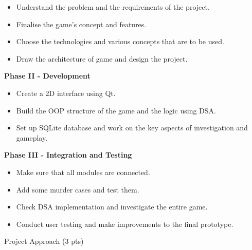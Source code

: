 \documentclass[11pt,a4paper]{article}
\newcommand{\blueheading}[1]{%
    {\sffamily\color{TitleBlue}\fontsize{15}{18}\selectfont #1}%
}
\begin{document}
{\begin{itemize}[leftmargin=1.5em, itemsep=4pt, topsep=0pt]
\item Understand the problem and the requirements of the project.
\item Finalise the game’s concept and features.
\item Choose the technologies and various concepts that are to be used.
\item Draw the architecture of game and design the project.
\end{itemize}
\vspace{2mm}
\textbf{Phase II - Development}
\begin{itemize}[leftmargin=1.5em, itemsep=4pt, topsep=0pt]
\item Create a 2D interface using Qt.
\item Build the OOP structure of the game and the logic using DSA.
\item Set up SQLite database and work on the key aspects of investigation and gameplay.
\end{itemize}
\vspace{2mm}
\textbf{Phase III - Integration and Testing}
\begin{itemize}[leftmargin=1.5em, itemsep=4pt, topsep=0pt]
\item Make sure that all modules are connected.
\item Add some murder cases and test them.
\item Check DSA implementation and investigate the entire game.
\item Conduct user testing and make improvements to the final prototype.
\end{itemize}
}
\vspace{12mm}
\newpage
\blueheading{Project Approach (3 pts)}

\vspace{1mm}
\end{document}

